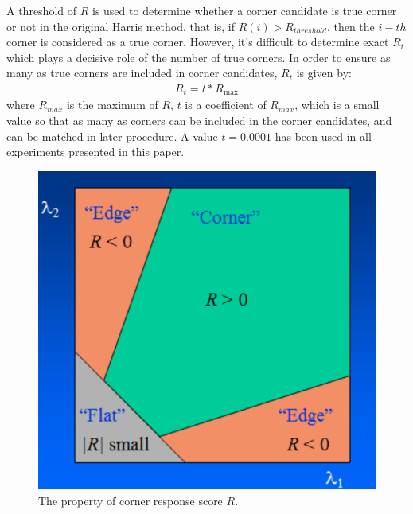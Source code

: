 \documentclass[letterpaper, 10 pt, conference]{ieeeconf}  %
\begin{document}
A threshold of ${R}$ is used to determine whether a corner candidate is true corner or not in the original Harris method, that is, if ${R(i) > R _ { threshold }}$, then the ${i-th}$ corner is considered as a true corner. However, it's difficult to determine exact ${R _ { t }}$ which plays a decisive role of the number of true corners. In order to ensure as many as true corners are included in corner candidates, ${R _ { t }}$ is given by:
\begin{equation}
\begin{split}
{R _ { t }} = t * R _ { \operatorname { max } }
\end{split}
\label{corner response score threshold}
\end{equation}
where ${R _ { max }}$ is the maximum of ${R}$, ${t}$ is a coefficient of ${R _ { max }}$, which is a small value so that as many as corners can be included in the corner candidates, and can be matched in later procedure. A value ${t = 0.0001}$ has been used in all experiments presented in this paper.
\begin{figure}[htbp]
\centering
\includegraphics[width=.9\linewidth]{experiments/corner_response_score.png}
\caption{The property of corner response score ${R}$.}
\label{corner response score property}
\end{figure}
\end{document}
